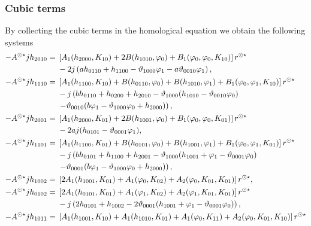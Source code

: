\subsubsection{Cubic terms}
By collecting the cubic terms in the homological equation we obtain the following systems
\begin{equation}
\label{btdde:eq:third_order_systems_tbt}
\begin{aligned}
-\SUNSTAR A jh_{2010} ={}& \left[A_1(h_{2000},K_{10})+ 2 B(h_{1010},\phi_0) + B_1(\phi_0,\phi_0,K_{10})\right]\rss \\
                         & -2j\left(a h_{0110} + h_{1100} - \vartheta_{1000} \phi_1 - a \vartheta_{0010} \phi_1   \right), \\
-\SUNSTAR A jh_{1110} ={}& \left[A_1(h_{1100},K_{10}) + B(h_{0110},\phi_0) + B(h_{1010},\phi_1) + B_1(\phi_0,\phi_1,K_{10})\right]\rss \\
                         & -j\left(b h_{0110} + h_{0200} + h_{2010} - \vartheta_{1000} (h_{1010} - \vartheta_{0010} \phi_0) \right. \\
                         & \left. - \vartheta_{0010} (b \phi_1 - \vartheta_{1000} \phi_0 + h_{2000})  \right), \\
-\SUNSTAR A jh_{2001} ={}& \left[A_1(h_{2000},K_{01}) + 2 B(h_{1001},\phi_0) + B_1(\phi_0,\phi_0,K_{01})\right]\rss \\
                         & - 2 a j(h_{0101} - \vartheta_{0001} \phi_1), \\
-\SUNSTAR A jh_{1101} ={}& \left[A_1(h_{1100},K_{01}) + B(h_{0101},\phi_0) + B(h_{1001},\phi_1) + B_1(\phi_0,\phi_1,K_{01})\right]\rss \\
                        & -j\left(b h_{0101} + h_{1100} + h_{2001} - \vartheta_{1000} (h_{1001} + \phi_1 - \vartheta_{0001} \phi_0) \right. \\
                        & \left. - \vartheta_{0001} (b \phi_1 - \vartheta_{1000} \phi_0 + h_{2000})  \right), \\
-\SUNSTAR A jh_{1002} ={}& \left[2 A_1(h_{1001},K_{01}) + A_1(\phi_0,K_{02}) + A_2(\phi_0,K_{01},K_{01})\right]\rss, \\
-\SUNSTAR A jh_{0102} ={}& \left[2 A_1(h_{0101},K_{01}) + A_1(\phi_1,K_{02}) + A_2(\phi_1,K_{01},K_{01})\right]\rss \\
                         & -j\left(2 h_{0101} + h_{1002} - 2 \vartheta_{0001} (h_{1001} + \phi_1 - \vartheta_{0001} \phi_0) \right), \\
-\SUNSTAR A jh_{1011} ={}& \left[A_1(h_{1001},K_{10}) + A_1(h_{1010},K_{01}) + A_1(\phi_0,K_{11}) + A_2(\phi_0,K_{01},K_{10})\right]\rss \\

\end{aligned}
\end{equation}

